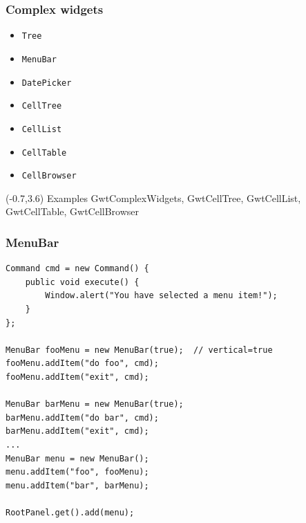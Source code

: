 \documentclass[10pt,table, xcolor=pdflatex]{beamer}
\begin{document}
\begin{frame}\frametitle{Complex widgets}
	\begin{itemize}
        \item \texttt{Tree}
        \item \texttt{MenuBar}
        \item \texttt{DatePicker}
        \item \texttt{CellTree}
        \item \texttt{CellList}
        \item \texttt{CellTable}
        \item \texttt{CellBrowser}
	\end{itemize}
\begin{textblock}{15}(-0.7,3.6)
    {\footnotesize Examples GwtComplexWidgets, GwtCellTree, GwtCellList, GwtCellTable, GwtCellBrowser}
\end{textblock}
\end{frame}


\begin{frame}[fragile]\frametitle{MenuBar}
	\lstset{language=Java, basicstyle=\footnotesize\ttfamily}
    \begin{lstlisting}
Command cmd = new Command() {
    public void execute() {
        Window.alert("You have selected a menu item!");
    }
};

MenuBar fooMenu = new MenuBar(true);  // vertical=true
fooMenu.addItem("do foo", cmd);
fooMenu.addItem("exit", cmd);

MenuBar barMenu = new MenuBar(true);
barMenu.addItem("do bar", cmd);
barMenu.addItem("exit", cmd);
...
MenuBar menu = new MenuBar();
menu.addItem("foo", fooMenu);
menu.addItem("bar", barMenu);

RootPanel.get().add(menu);
    \end{lstlisting}
\end{frame}
\end{document}
